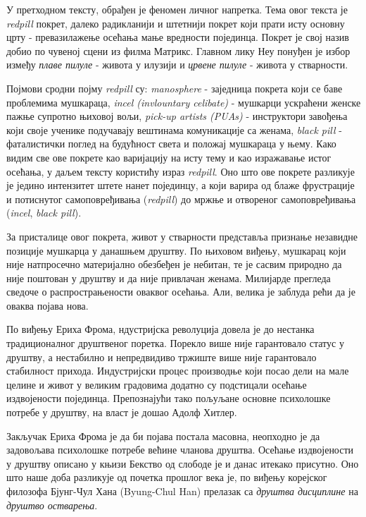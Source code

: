 \documentclass[b5paper]{article}
\begin{document}
\large

У претходном тексту, обрађен је феномен личног напретка. Тема овог текста је \textit{redpill} покрет, далеко радикланији и штетнији покрет који прати исту основну црту - превазилажење осећања мање вредности појединца. Покрет је свој назив добио по чувеној сцени из филма Матрикс. Главном лику Неу понуђен је избор између \textit{плаве пилуле} - живота у илузији и \textit{црвене пилуле} - живота у стварности.

Појмови сродни појму \textit{redpill} су: \textit{manosphere} - заједница покрета који се баве проблемима мушкараца, \textit{incel (invlountary celibate)} - мушкарци ускраћени женске пажње супротно њиховој вољи, \textit{pick-up artists (PUAs)} - инструктори завођења који своје ученике подучавају вештинама комуникације са женама, \textit{black pill} - фаталистички поглед на будућност света и положај мушкараца у њему. Како видим све ове покрете као варијацију на исту тему и као изражавање истог осећања, у даљем тексту користићу израз \textit{redpill}. Оно што ове покрете разликује је једино интензитет штете нанет појединцу, а који варира од блаже фрустрације и потиснутог самоповређивања (\textit{redpill}) до мржње и отвореног самоповређивања (\textit{incel}, \textit{black pill}).

За присталице овог покрета, живот у стварности представља признање незавидне позиције мушкарца у данашњем друштву. По њиховом виђењу, мушкарац који није натпросечно материјално обезбеђен је небитан, те је сасвим природно да није поштован у друштву и да није привлачан женама. Милијарде прегледа сведоче о распрострањености оваквог осећања. Али, велика је заблуда рећи да је оваква појава нова.

По виђењу Ериха Фрома, ндустријска револуција довела је до нестанка традиционалног друштвеног поретка. Порекло више није гарантовало статус у друштву, а нестабилно и непредвидиво тржиште више није гарантовало стабилност прихода. Индустријски процес производње који посао дели на мале целине и живот у великим градовима додатно су подстицали осећање издвојености појединца. Препознајући тако пољуљане основне психолошке потребе у друштву, на власт је дошао Адолф Хитлер.

Закључак Ериха Фрома је да би појава постала масовна, неопходно је да задовољава психолошке потребе већине чланова друштва. Осећање издвојености у друштву описано у књизи Бекство од слободе је и данас итекако присутно. Оно што наше доба разликује од почетка прошлог века је, по виђењу корејског филозофа Бјунг-Чул Хана (Byung-Chul Han) прелазак са \textit{друштва дисциплине} на \textit{друштво остварења}.
\end{document}
